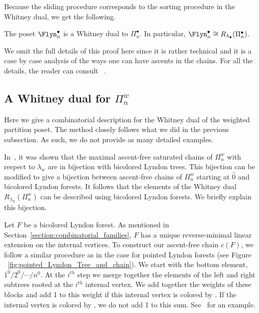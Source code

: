 Because the sliding procedure corresponds to the sorting procedure in the Whitney dual, we get the following.




\begin{theo} \label{theorem:whitney_dual_pointed} \label{theorem:flynpointed_dual} The poset $\Flyn_{n}^{\bullet}$ is a Whitney dual to $\Pi_n^\bullet$. In particular, $\Flyn_{n}^{\bullet}\cong R_{\lambda_\bullet}(\Pi_n^\bullet)$.
\end{theo}

We omit the full details of this proof here since it is rather technical and it is  a case by case analysis of the ways one can have ascents in the chains.     For all the details, the reader can consult ~\cite[Section 3.2.2]{QuicenoDuran2020}.

   
   
    
\subsection{A Whitney dual for \texorpdfstring{$\Pi_n^w$}-}\label{section:WhitneyDualOfWeighted}  Here we give a combinatorial description for the Whitney dual of the weighted partition poset.  The method closely follows what we did in the previous subsection. As such, we do not provide as many detailed examples.




In~\cite[Theorem 5.7]{GonzalezDleonWachs2016}, it was shown that the maximal ascent-free saturated chains of $\Pi_n^w$   with respect to $\lambda_w$ are in bijection with bicolored Lyndon trees.   This bijection can be modified  to give a bijection between ascent-free chains of $\Pi_n^w$ starting at $\hat{0}$ and bicolored Lyndon forests.  It follows that the elements of the Whitney dual $R_{\lambda_w}(\Pi_n^w)$ can be described using bicolored Lyndon forests.    We briefly explain this bijection.



Let $F$ be a bicolored Lyndon forest. As mentioned in Section~\ref{section:combinatorial_families},  $F$ has a unique reverse-minimal linear extension on the internal vertices.  To construct our ascent-free chain $c(F)$, we follow a similar procedure as in the case for pointed Lyndon forests (see Figure ~\ref{fig:pointed_Lyndon_Tree_and_chain}). We start with the   bottom element, $1^0/2^0/\cdots /n^0$.  At the $i^{th}$ step we merge together the elements of the left and right subtrees rooted at the $i^{th}$ internal vertex. We add together the weights of these blocks and add 1 to this weight if this internal vertex is colored by . If the internal vertex is colored by , we do not add 1 to this sum. See~\cite[Figure 4]{GonzalezDleonWachs2016} for an example. 

